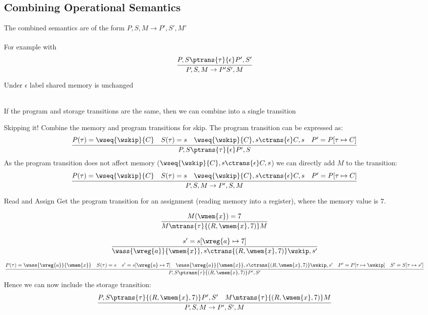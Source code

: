 \subsection{Combining Operational Semantics}
The combined semantics are of the form $P, S, M \to P', S', M'$
\\
\\ For example with 
\[\cfrac{
    P, S \ptrans{\tau}{\epsilon} P', S'
}{
    P, S, M \to P' S', M
}\]
\centerline{Under $\epsilon$ label shared memory is unchanged}
\\
If the program and storage transitions are the same, then we can combine into a single transition
\begin{examplebox}{Skipping it!}
    Combine the memory and program transitions for skip.
    \tcblower
    The program transition can be expressed as:
    \[\cfrac{
        P(\tau) = \wseq{\wskip}{C} \quad S(\tau) = s \quad \wseq{\wskip}{C}, s \ctrans{\epsilon} C,s \quad P' = P[\tau \mapsto C]    
    }{
        P, S \ptrans{\tau}{\epsilon} P', S
    }\]
    As the program transition does not affect memory ($\wseq{\wskip}{C}, s \ctrans{\epsilon} C,s$) we can directly add $M$ to the transition:
    \[\cfrac{
        P(\tau) = \wseq{\wskip}{C} \quad S(\tau) = s \quad \wseq{\wskip}{C}, s \ctrans{\epsilon} C,s \quad P' = P[\tau \mapsto C]    
    }{
        P, S, M \to P', S, M
    }\]
\end{examplebox}
\begin{examplebox}{Read and Assign}
    Get the program transition for an assignment (reading memory into a register), where the memory value is $7$.
    \tcblower
    \begin{minipage}{.5\textwidth}
        \[\cfrac
        {
            M(\wmem{x}) = 7
        }{
            M \mtrans{\tau}{(R, \wmem{x}, 7)} M
        }
    \]    
    \end{minipage}
    \begin{minipage}{.5\textwidth}
    \[\cfrac{
        s' = s[\wreg{a} \mapsto 7]
    }{
        \wass{\wreg{a}}{\wmem{x}}, s \ctrans{(R, \wmem{x}, 7)} \wskip, s'
    }\]
    \end{minipage}
    
    \[\cfrac{
        P(\tau) = \wass{\wreg{a}}{\wmem{x}} \quad S(\tau) = s \quad s' = s[\wreg{a} \mapsto 7] \quad \wass{\wreg{a}}{\wmem{x}},s \ctrans{(R, \wmem{x}, 7)} \wskip, s' \quad P' = P[\tau \mapsto \wskip] \quad S' = S[\tau \mapsto s']
    }{
        P,S \ptrans{\tau}{(R, \wmem{x}, 7)} P', S'
    }\]
    Hence we can now include the storage transition:
    \[\cfrac{
        P,S \ptrans{\tau}{(R, \wmem{x}, 7)} P', S' \quad M \mtrans{\tau}{(R, \wmem{x}, 7)} M
    }{
        P, S, M \to P', S', M
    }\]
\end{examplebox}

